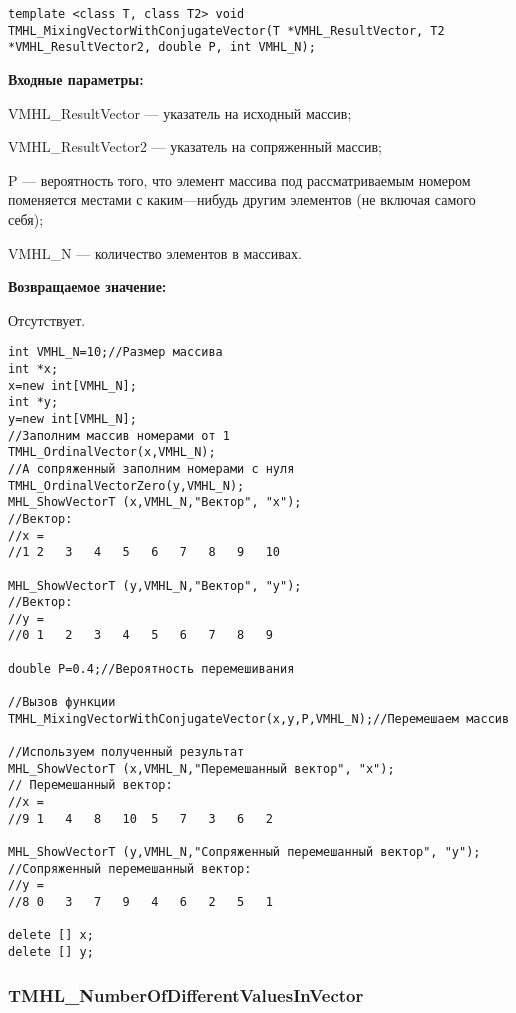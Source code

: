 \documentclass[a4paper,12pt]{article}
\begin{document}
\begin{lstlisting}[label=code_syntax_TMHL_MixingVectorWithConjugateVector,caption=Синтаксис]
template <class T, class T2> void TMHL_MixingVectorWithConjugateVector(T *VMHL_ResultVector, T2 *VMHL_ResultVector2, double P, int VMHL_N);
\end{lstlisting}

\textbf{Входные параметры:}
 
VMHL\_ResultVector --- указатель на исходный массив;
 
VMHL\_ResultVector2 --- указатель на сопряженный массив;
 
P --- вероятность того, что элемент массива под рассматриваемым номером поменяется местами с каким---нибудь другим элементов (не включая самого себя);
 
VMHL\_N --- количество элементов в массивах.

\textbf{Возвращаемое значение:}

Отсутствует.


\begin{lstlisting}[label=code_use_TMHL_MixingVectorWithConjugateVector,caption=Пример использования]
int VMHL_N=10;//Размер массива
int *x;
x=new int[VMHL_N];
int *y;
y=new int[VMHL_N];
//Заполним массив номерами от 1
TMHL_OrdinalVector(x,VMHL_N);
//А сопряженный заполним номерами с нуля
TMHL_OrdinalVectorZero(y,VMHL_N);
MHL_ShowVectorT (x,VMHL_N,"Вектор", "x");
//Вектор:
//x =
//1	2	3	4	5	6	7	8	9	10

MHL_ShowVectorT (y,VMHL_N,"Вектор", "y");
//Вектор:
//y =
//0	1	2	3	4	5	6	7	8	9

double P=0.4;//Вероятность перемешивания

//Вызов функции
TMHL_MixingVectorWithConjugateVector(x,y,P,VMHL_N);//Перемешаем массив

//Используем полученный результат
MHL_ShowVectorT (x,VMHL_N,"Перемешанный вектор", "x");
// Перемешанный вектор:
//x =
//9	1	4	8	10	5	7	3	6	2

MHL_ShowVectorT (y,VMHL_N,"Сопряженный перемешанный вектор", "y");
//Сопряженный перемешанный вектор:
//y =
//8	0	3	7	9	4	6	2	5	1

delete [] x;
delete [] y;
\end{lstlisting}

\subsubsection{TMHL\_NumberOfDifferentValuesInVector}\label{TMHL_NumberOfDifferentValuesInVector}
\end{document}
